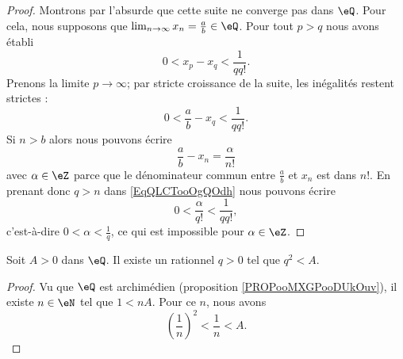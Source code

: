 \begin{proof}
	Montrons par l'absurde que cette suite ne converge pas dans \( \eQ\). Pour cela, nous supposons que \( \lim_{n\to \infty} x_n=\frac{ a }{b }\in \eQ\). Pour tout \( p>q\) nous avons établi
	\begin{equation}
		0<x_p-x_q<\frac{1}{ qq! }.
	\end{equation}
	Prenons la limite \( p\to \infty\); par stricte croissance de la suite, les inégalités restent strictes :
	\begin{equation}        \label{EqQLCTooOgQOdh}
		0<\frac{ a }{ b }-x_q<\frac{1}{ qq! }.
	\end{equation}
	Si \( n>b\) alors nous pouvons écrire
	\begin{equation}
		\frac{ a }{ b }-x_n=\frac{ \alpha }{ n! }
	\end{equation}
	avec \( \alpha\in \eZ\) parce que le dénominateur commun entre \( \frac{ a }{ b }\) et \( x_n\) est dans \( n!\). En prenant donc \( q>n\) dans \eqref{EqQLCTooOgQOdh} nous pouvons écrire
	\begin{equation}
		0<\frac{ \alpha }{ q! }<\frac{1}{ qq! },
	\end{equation}
	c'est-à-dire \( 0<\alpha<\frac{1}{ q }\), ce qui est impossible pour \( \alpha\in \eZ\).
\end{proof}

\begin{lemma}   \label{LEMooDTXYooKwmlZh}
	Soit \( A>0\) dans \( \eQ\). Il existe un rationnel \( q>0\) tel que \( q^2<A\).
\end{lemma}

\begin{proof}
	Vu que \( \eQ\) est archimédien (proposition \ref{PROPooMXGPooDUkOuv}), il existe \( n\in \eN\) tel que \( 1<nA\). Pour ce \( n\), nous avons
	\begin{equation}
		\left( \frac{1}{ n } \right)^2<\frac{1}{ n }<A.
	\end{equation}
\end{proof}

